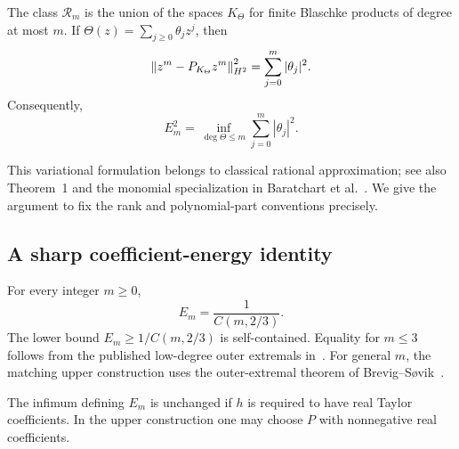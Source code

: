 \begin{lemma}
\label{I:B:lem:hardy-model}
The class $\mathcal R_m$ is the union of the spaces $K_\Theta$ for finite
Blaschke products of degree at most $m$.  If
$\Theta(z)=\sum_{j\ge0}\theta_jz^j$, then
\begin{equation}
 \left\lVert z^m-P_{K_\Theta}z^m\right\rVert_{H^2}^2
 =\sum_{j=0}^m|\theta_j|^2.
 \label{I:B:eq:hardy-model-error}
\end{equation}
Consequently,
\begin{equation}
 E_m^2=\inf_{\deg\Theta\le m}\sum_{j=0}^m|\theta_j|^2.
 \label{I:B:eq:hardy-Blaschke-variational}
\end{equation}
\end{lemma}


This variational formulation belongs to classical rational approximation;
see also Theorem~1 and the monomial specialization in
Baratchart et al.~\cite{rational2026}.  We give the argument to fix the
rank and polynomial-part conventions precisely.

\subsection{A sharp coefficient-energy identity}

\begin{theorem}
\label{I:B:thm:hardy-bridge}
For every integer $m\ge0$,
\begin{equation}
 \boxed{\displaystyle E_m=\frac1{C(m,2/3)}.}
 \label{I:B:eq:hardy-exact-bridge}
\end{equation}
The lower bound $E_m\ge1/C(m,2/3)$ is self-contained. Equality for $m\le3$ follows from the published low-degree outer extremals in~\cite{brevig2020}. For general $m$, the matching upper construction uses the outer-extremal theorem of Brevig--S\o vik~\cite{outer2026}.
\end{theorem}


\begin{corollary}
\label{I:B:cor:hardy-real}
The infimum defining $E_m$ is unchanged if $h$ is required to have real
Taylor coefficients.  In the upper construction one may choose $P$ with
nonnegative real coefficients.
\end{corollary}


